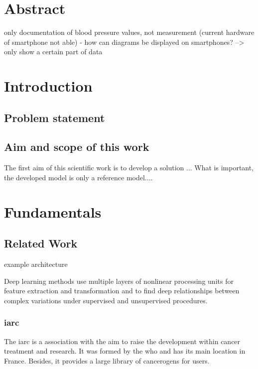 


%
\chapter{Abstract}\label{abstract}

only documentation of blood pressure values, not measurement (current hardware of smartphone not able)
- how can diagrams be displayed on smartphones? --> only show a certain part of data

\chapter{Introduction}\label{introduction}

\section{Problem statement}


\section{Aim and scope of this work}

The first aim of this scientific work is to develop a solution ...
What is important, the developed model is only a reference model....

\chapter{Fundamentals}\label{fundamentals}

\section{Related Work}

example architecture

Deep learning methods use multiple layers of nonlinear processing units for feature extraction and transformation and to find deep relationships between complex variations under supervised and unsupervised procedures.

\subsection{\ac{iarc}}

The \ac{iarc} is a association with the aim to raise the development within cancer treatment and research. It was formed by the \ac{who} and has its main location in France. Besides, it provides a large library of cancerogens for users.



